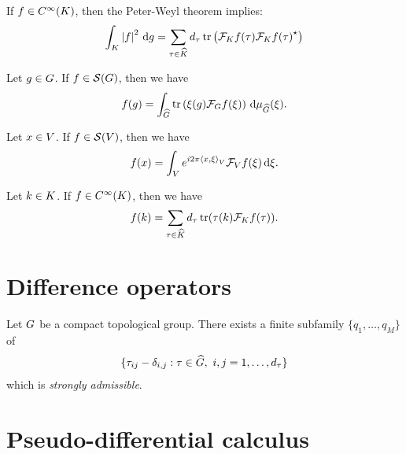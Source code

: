\begin{example}
    If $f \in \SmoothFunctions{\CompactGroup}$,
    then the Peter-Weyl theorem implies:
    \begin{align*}
        \int_\CompactGroup \abs{f}^2 \dd g
        = \sum_{\tau \in \dualGroup\CompactGroup}
            \dimRep\tau
            \tr \left(
                \Fourier[\CompactGroup] f(\tau)
                \adj{\Fourier[\CompactGroup] f(\tau)}
            \right)
    \end{align*}
\end{example}

\begin{proposition}
    Let $g \in \Group$.
    If $f \in \Schwartz\Group$,
    then we have
    \begin{align*}
        f(g) =
        \int_\dualGroup\Group
            \tr\left(
                \xi(g)
                \Fourier f(\xi)
            \right)
        \dd \Plancherel\Group(\xi).
    \end{align*}
\end{proposition}

\begin{example}
    Let $x \in \VectorSpace$.
    If $f \in \Schwartz\VectorSpace$,
    then we have
    \begin{align*}
        f(x) =
        \int_\VectorSpace
            \e^{\i \turn \ip{x}{\xi}} \Fourier[\VectorSpace] f(\xi)
        \dd \xi.
    \end{align*}
\end{example}

\begin{example}
    Let $k \in \CompactGroup$.
    If $f \in \SmoothFunctions\CompactGroup$,
    then we have
    \begin{align*}
        f(k) =
        \sum_{\tau \in \dualGroup\CompactGroup}
            \dimRep\tau
            \tr(\tau(k) \Fourier[\CompactGroup] f(\tau)).
    \end{align*}
\end{example}

\section{Difference operators}

\begin{proposition}
    Let $\Group$ be a compact topological group.
    There exists a finite subfamily $\{q_1, \dots, q_M\}$ of
    \begin{align*}
        \{ \tau_{ij} - \Kronecker{i}{j} : \tau \in \dualGroup\Group,\ i, j = 1, \dots, \dimRep\tau \}
    \end{align*}
    which is \emph{strongly admissible}.
\end{proposition}

\section{Pseudo-differential calculus}
